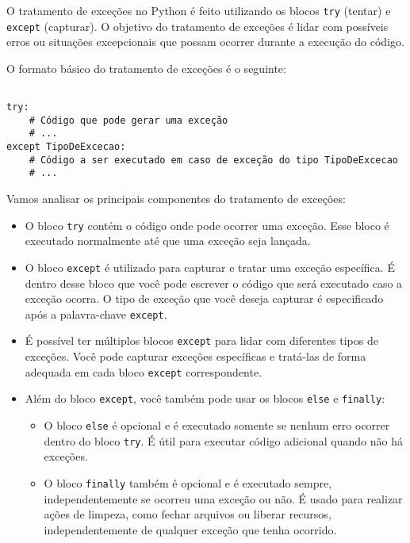 \documentclass[a4paper, 12pt, onecolumn,singlespacing]{article}
\begin{document}
	\label{python_try_except}

O tratamento de exceções no Python é feito utilizando os blocos \texttt{try} (tentar) e \texttt{except} (capturar). O objetivo do tratamento de exceções é lidar com possíveis erros ou situações excepcionais que possam ocorrer durante a execução do código.

O formato básico do tratamento de exceções é o seguinte:

\begin{verbatim}
	
try:
	# Código que pode gerar uma exceção
	# ...
except TipoDeExcecao:
	# Código a ser executado em caso de exceção do tipo TipoDeExcecao
	# ...

\end{verbatim}
Vamos analisar os principais componentes do tratamento de exceções:

\begin{itemize}
	\item O bloco \texttt{try} contém o código onde pode ocorrer uma exceção. Esse bloco é executado normalmente até que uma exceção seja lançada.
	
	\item O bloco \texttt{except} é utilizado para capturar e tratar uma exceção específica. É dentro desse bloco que você pode escrever o código que será executado caso a exceção ocorra. O tipo de exceção que você deseja capturar é especificado após a palavra-chave \texttt{except}.
	
	\item É possível ter múltiplos blocos \texttt{except} para lidar com diferentes tipos de exceções. Você pode capturar exceções específicas e tratá-las de forma adequada em cada bloco \texttt{except} correspondente.
	
	\item Além do bloco \texttt{except}, você também pode usar os blocos \texttt{else} e \texttt{finally}:
	
	\begin{itemize}
		
		\item O bloco \texttt{else} é opcional e é executado somente se nenhum erro ocorrer dentro do bloco \texttt{try}. É útil para executar código adicional quando não há exceções.
		
		\item O bloco \texttt{finally} também é opcional e é executado sempre, independentemente se ocorreu uma exceção ou não. É usado para realizar ações de limpeza, como fechar arquivos ou liberar recursos, independentemente de qualquer exceção que tenha ocorrido.
		
	\end{itemize}
	
\end{itemize}
\end{document}
